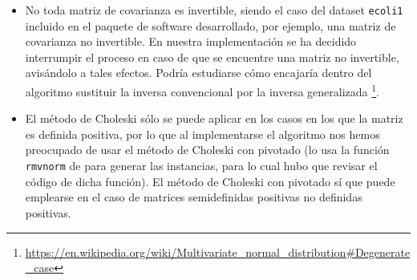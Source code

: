 \begin{itemize} 
 \item No toda matriz de covarianza es invertible, siendo el caso del dataset \texttt{ecoli1} incluido en el paquete de software 
 desarrollado, por ejemplo, una matriz de covarianza no invertible. En nuestra implementación se ha decidido interrumpir
 el proceso en caso de que se encuentre una matriz no invertible, avisándolo a tales efectos. Podría estudiarse cómo encajaría
 dentro del algoritmo sustituir la inversa convencional por la inversa generalizada 
 \footnote{\url{https://en.wikipedia.org/wiki/Multivariate_normal_distribution\#Degenerate_case}}.

 \item El método de Choleski sólo se puede aplicar en los casos en los que la matriz es definida positiva, por lo que 
 al implementarse el algoritmo nos hemos preocupado de usar el método de Choleski con pivotado (lo usa la función \texttt{rmvnorm}
 de  para generar las instancias, para lo cual hubo que revisar el código de dicha función). El método
 de Choleski con pivotado sí que puede emplearse en el caso de matrices semidefinidas positivas no definidas positivas.
\end{itemize}

